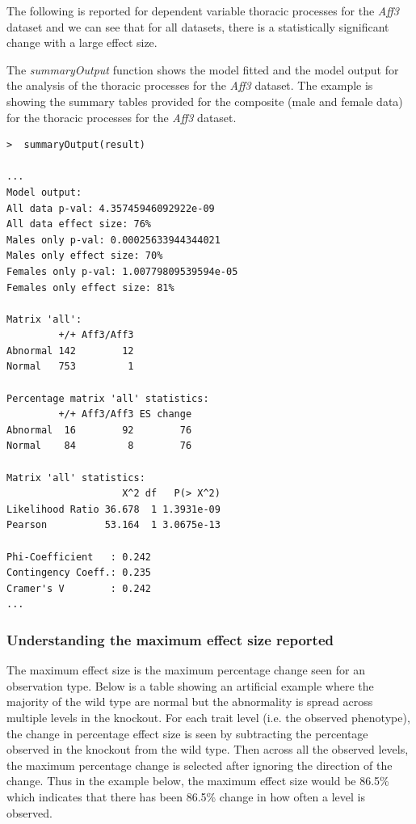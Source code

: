\documentclass[12pt,a4paper]{article}
\begin{document}
The following is reported for dependent variable thoracic processes for the \textit{Aff3} dataset and we can see that for all datasets, there is a statistically significant change with a large effect size. 

The \textit{summaryOutput} function shows the model fitted and the model output for the analysis of the thoracic processes for the \textit{Aff3} dataset. 
The example is showing the summary tables provided for the composite (male and female data) for the thoracic processes for the \textit{Aff3} dataset. 

\begingroup
    \fontsize{8pt}{12pt}\selectfont
\begin{verbatim}
>  summaryOutput(result)

...
Model output:
All data p-val: 4.35745946092922e-09
All data effect size: 76%
Males only p-val: 0.00025633944344021
Males only effect size: 70%
Females only p-val: 1.00779809539594e-05
Females only effect size: 81%

Matrix 'all':
         +/+ Aff3/Aff3
Abnormal 142        12
Normal   753         1

Percentage matrix 'all' statistics:
         +/+ Aff3/Aff3 ES change
Abnormal  16        92        76
Normal    84         8        76

Matrix 'all' statistics:
                    X^2 df   P(> X^2)
Likelihood Ratio 36.678  1 1.3931e-09
Pearson          53.164  1 3.0675e-13

Phi-Coefficient   : 0.242 
Contingency Coeff.: 0.235 
Cramer's V        : 0.242 
...

\end{verbatim}
\endgroup 


\subsubsection{Understanding the maximum effect size reported}
\label{FE_EffectSize}
The maximum effect size is the maximum percentage change seen for an observation type. 
Below is a table showing an artificial example where the majority of the wild type are normal but the abnormality is spread across multiple levels in the knockout. 
For each trait level (i.e. the observed phenotype), the change in percentage effect size is seen by subtracting the percentage observed in the knockout from the wild type. 
Then across all the observed levels, the maximum percentage change is selected after ignoring the direction of the change. 
Thus in the example below, the maximum effect size would be 86.5\% which indicates that there has been 86.5\% change in how often a level is observed.
\end{document}
